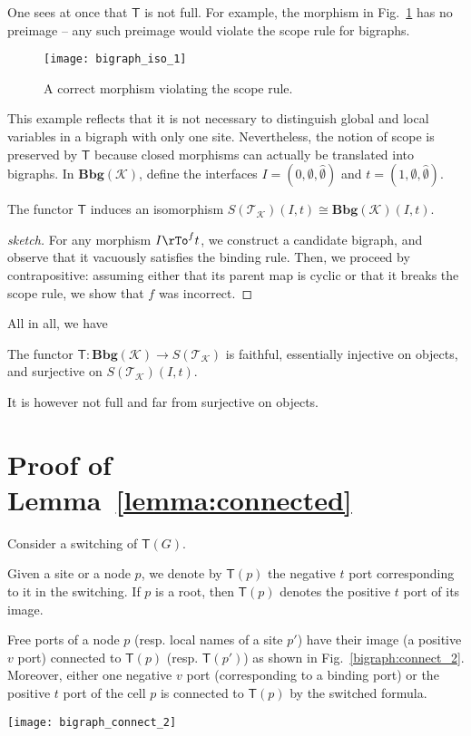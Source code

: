 \documentclass{llncs}
\newcommand{\cat}[1]{\mathbf{#1}}
\newcommand{\fonc}[1]{\mathsf{#1}}
\newcommand{\bsig}{\mathcal{K}} \newcommand{\model}{\mathcal{L}} \newcommand{\bbig}{\cat{Bbg}} \newcommand{\T}{\fonc{T}} \newcommand{\theory}{\mathcal{T}}
\newcommand{\iso}{\cong}
\begin{document}
One sees at once that $\T$ is not full. For example, the morphism in
Fig.~\ref{bigraph:iso_1} has no preimage -- any such preimage would
violate the scope rule for bigraphs.
\begin{figure}[!ht] \centering
    \texttt{[image: bigraph\_iso\_1]}
    \caption{A correct morphism violating the scope rule.}
    \label{bigraph:iso_1}
\end{figure}
This example reflects that it is not necessary to distinguish global and local
variables in a bigraph with only one site. 
Nevertheless, the notion of scope is preserved by $\T$ because closed morphisms
can actually be translated into bigraphs.
In $\bbig(\bsig)$, define 
the interfaces $I = ( 0, \emptyset, \widehat{\emptyset} )$
and $t = (1,\emptyset,\widehat{\emptyset})$.
\begin{lemma}\label{lemma:closed}
  The functor $\T$ induces an isomorphism $S (\theory_\bsig) (I, t)
  \iso \bbig (\bsig) (I, t)$.
\end{lemma}
\begin{proof}[sketch]
  For any morphism $I \rTo^{f} t$, we construct a candidate bigraph,
  and observe that it vacuously satisfies the binding rule.  Then, we
  proceed by contrapositive: assuming either that its parent map is
  cyclic or that it breaks the scope rule, we show that $f$ was
  incorrect.
\end{proof}


All in all, we have 
\begin{theorem}\label{thm:conservative}
  The functor $\T: \bbig(\bsig) \to S(\theory_\bsig)$ is faithful, essentially
  injective on objects, and surjective on $S(\theory_\bsig)(I, t)$.
\end{theorem}
It is however not full and far from surjective on objects.




\appendix


\section{Proof of Lemma~\ref{lemma:connected}}
Consider a switching of $\T(G)$.

Given a site or a node $p$, we denote by $\T(p)$ the 
negative $t$ port corresponding to it in the switching. If $p$ is
a root, then $\T(p)$ denotes the positive $t$ port of its
image.

Free ports of a node $p$ (resp. local names of a site $p'$) have
their image (a positive $v$ port) connected to $\T(p)$
(resp. $\T(p')$) as shown in Fig.~\ref{bigraph:connect_2}.
Moreover, either one negative $v$ port (corresponding to
a binding port) or the positive $t$ port of the cell $p$ is
connected to $\T(p)$ by the switched formula.
\begin{figure*}[th] \centering
  \texttt{[image: bigraph\_connect\_2]}
  \caption{Domain, codomain and a node of a switching.}
  \label{bigraph:connect_2}
\end{figure*}
\end{document}
